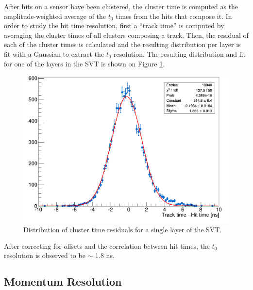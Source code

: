 After hits on a sensor have been
clustered, the cluster time is computed as the amplitude-weighted average
of the $t_0$ times from the hits that compose it.  In order to study the hit
time resolution, first a ``track time'' is computed by averaging the cluster 
times of all clusters composing a track.  Then, the residual of each of the 
cluster times is
calculated and the resulting distribution per layer is fit with a Gaussian
to extract the $t_0$ resolution.  The resulting distribution and fit for 
one of the layers in the SVT is shown on Figure \ref{fig:t0_res}.  
\begin{figure}[h!b]
    \centering
    \includegraphics[width=.7\textwidth]{images/t0_res.png}
    \caption{Distribution of cluster time residuals for a single layer of
    the SVT.}
    \label{fig:t0_res}
\end{figure} 
After correcting for offsets and the correlation between hit times, 
the $t_{0}$ resolution is observed to be $\sim$ 
1.8 ns.

\subsection{Momentum Resolution}

